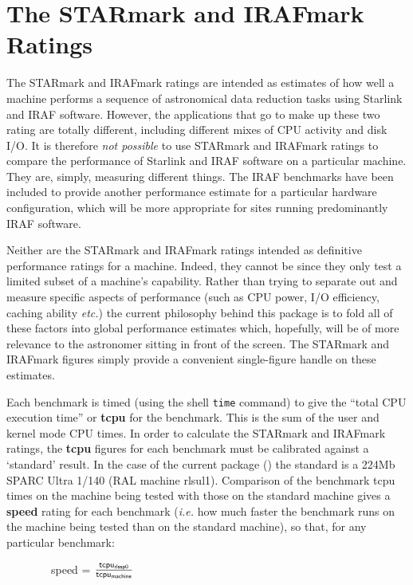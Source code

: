 \newpage
\section{The STARmark and IRAFmark Ratings}
\label{starmark}

The STARmark and IRAFmark ratings are intended as estimates of how well a
machine performs a sequence of astronomical data reduction tasks using
Starlink and IRAF software. However, the applications that go to make up
these two rating are totally different, including different mixes of CPU
activity and disk I/O. It is therefore {\em not possible} to use STARmark
and IRAFmark ratings to compare the performance of Starlink and IRAF
software on a particular machine.  They are, simply, measuring different
things. The IRAF benchmarks have been included to provide another
performance estimate for a particular hardware configuration, which will
be more appropriate for sites running predominantly IRAF software. 

Neither are the STARmark and IRAFmark ratings intended as definitive
performance ratings for a machine. Indeed, they cannot be since they
only test a limited subset of a machine's capability.  Rather than
trying to separate out and measure specific aspects of performance
(such as CPU power, I/O efficiency, caching ability {\em etc.}) the
current philosophy behind this package is to fold all of these factors
into global performance estimates which, hopefully, will be of more
relevance to the astronomer sitting in front of the screen.  The
STARmark and IRAFmark figures simply provide a convenient single-figure
handle on these estimates.

Each benchmark is timed (using the shell {\tt time} command) to give
the ``total CPU execution time'' or {\bf tcpu} for the benchmark. This
is the sum of the user and kernel mode CPU times. In order to calculate
the STARmark and IRAFmark ratings, the {\bf tcpu} figures for each
benchmark must be calibrated against a `standard' result.  In the case
of the current package (\pkgver) the standard is a 224Mb SPARC Ultra 1/140
(RAL machine rlsul1). Comparison of the benchmark tcpu times on the
machine being tested with those on the standard machine gives a {\bf
speed} rating for each benchmark ({\em i.e.} how much faster the
benchmark runs on the machine being tested than on the standard
machine), so that, for any particular benchmark:

\vspace{5mm}
\begin{large}
~~~~~~~~speed = $\frac{{\sf tcpu_{rlssp0}}}{{\sf tcpu_{machine}}}$
\end{large}
\vspace{5mm}

